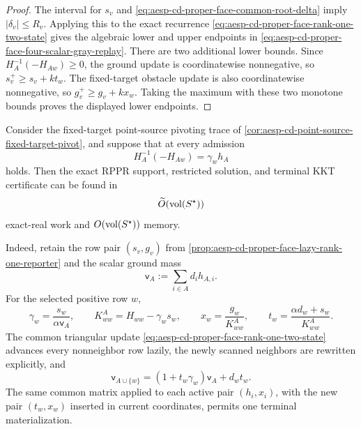 \begin{proof}
The interval for \(s_v\) and
\cref{eq:aesp-cd-proper-face-common-root-delta} imply
\(|\delta_v|\leq R_v\).  Applying this to the exact recurrence
\cref{eq:aesp-cd-proper-face-rank-one-two-state} gives the algebraic lower
and upper endpoints in
\cref{eq:aesp-cd-proper-face-four-scalar-gray-replay}.
There are two additional lower bounds.  Since
\(H_A^{-1}(-H_{Aw})\geq0\), the ground update is coordinatewise
nonnegative, so \(s_v^+\geq s_v+kt_w\).  The fixed-target obstacle update is
also coordinatewise nonnegative, so \(g_v^+\geq g_v+kx_w\).  Taking the
maximum with these two monotone bounds proves the displayed lower endpoints.
\end{proof}

\begin{corollary}
\label{cor:aesp-cd-exact-rank-one-trace-discovery}
Consider the fixed-target point-source pivoting trace of
\cref{cor:aesp-cd-point-source-fixed-target-pivot}, and suppose that at every
admission
\begin{equation}
 H_A^{-1}(-H_{Aw})=\gamma_wh_A
 \label{eq:aesp-cd-exact-rank-one-trace-hypothesis}
\end{equation}
holds.  Then the exact RPPR support, restricted solution, and terminal KKT
certificate can be found in
\begin{equation}
 \widetilde O(\operatorname{vol}(S^\star))
 \label{eq:aesp-cd-exact-rank-one-trace-work}
\end{equation}
exact-real work and \(O(\operatorname{vol}(S^\star))\) memory.

Indeed, retain the row pair \((s_v,g_v)\) from
\cref{prop:aesp-cd-proper-face-lazy-rank-one-reporter} and the scalar ground
mass
\begin{equation*}
 \mathsf v_A:=\sum_{i\in A}d_ih_{A,i}.
\end{equation*}
For the selected positive row \(w\),
\begin{equation}
 \gamma_w=\frac{s_w}{\alpha\mathsf v_A},
 \qquad
 K^A_{ww}=H_{ww}-\gamma_ws_w,
 \qquad
 x_w=\frac{g_w}{K^A_{ww}},
 \qquad
 t_w=\frac{\alpha d_w+s_w}{K^A_{ww}}.
 \label{eq:aesp-cd-exact-rank-one-trace-scalars}
\end{equation}
The common triangular update
\cref{eq:aesp-cd-proper-face-rank-one-two-state} advances every nonneighbor
row lazily, the newly scanned neighbors are rewritten explicitly, and
\begin{equation*}
 \mathsf v_{A\cup\{w\}}
 =(1+t_w\gamma_w)\mathsf v_A+d_wt_w.
\end{equation*}
The same common matrix applied to each active pair \((h_i,x_i)\), with the
new pair \((t_w,x_w)\) inserted in current coordinates, permits one terminal
materialization.


\end{corollary}
